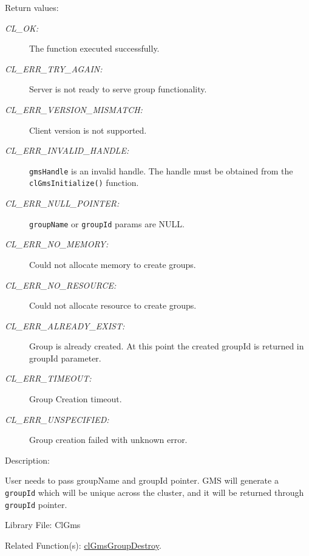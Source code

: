 \begin{flushleft}
 \begin{Desc}
 \item[Return values:]
 \begin{description}
 \item[{\em CL\_\-OK:}]The function executed successfully.
\item[{\em CL\_\-ERR\_\-TRY\_\-AGAIN:}] Server is not ready to serve group functionality.
      \item[{\em CL\_\-ERR\_\-VERSION\_\-MISMATCH:}] Client version is not supported.
      \item[{\em CL\_\-ERR\_\-INVALID\_\-HANDLE:}] {\tt{gmsHandle}} is an invalid handle. The handle must be obtained from the
{\tt{clGmsInitialize()}} function. 
      \item[{\em CL\_\-ERR\_\-NULL\_\-POINTER:}] {\tt{groupName}} or {\tt{groupId}} params are NULL.
      \item[{\em CL\_\-ERR\_\-NO\_\-MEMORY:}] Could not allocate memory to create groups.
      \item[{\em CL\_\-ERR\_\-NO\_\-RESOURCE:}] Could not allocate resource to create groups.
      \item[{\em CL\_\-ERR\_\-ALREADY\_\-EXIST:}] Group is already created. At this point the created
                                groupId is returned in groupId parameter.
      \item[{\em CL\_\-ERR\_\-TIMEOUT:}] Group Creation timeout.
     \item[{\em CL\_\-ERR\_\-UNSPECIFIED:}] Group creation failed with unknown error.

  \end{description}
   \end{Desc}

  \begin{Desc}
  \item[Description:]

User needs to pass groupName and groupId pointer. GMS will
 generate a {\tt{groupId}} which will be unique across the cluster, and it will be
 returned through {\tt{groupId}} pointer. \end{Desc}
 \begin{Desc}
\item[Library File:]Cl\-Gms\end{Desc}
\begin{Desc}
\item[Related Function(s):] \hyperlink{pagegms111}{clGmsGroupDestroy}.
  \end{Desc}





\end{flushleft}
